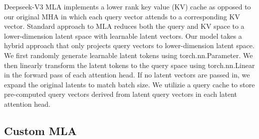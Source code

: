 Deepseek-V3 MLA implements a lower rank key value (KV) cache as opposed to our original MHA in which each query vector attends to a corresponding KV vector\cite{liu2024deepseekv2}. Standard approach to MLA reduces both the query and KV space to a lower-dimension latent space with learnable latent vectors\cite{liu2024deepseekv2}. Our model takes a hybrid approach that only projects query vectors to lower-dimension latent space. We first randomly generate learnable latent tokens using torch.nn.Parameter. We then linearly transform the latent tokens to the query space using torch.nn.Linear in the forward pass of each attention head. If no latent vectors are passed in, we expand the original latents to match batch size. We utilizie a query cache to store pre-computed query vectors derived from latent query vectors in each latent attention head.
\subsection{Custom MLA}